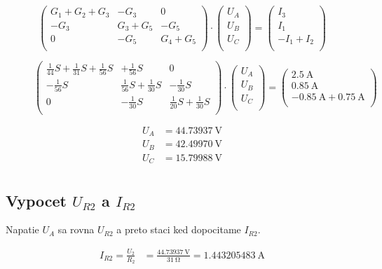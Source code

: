 \begin{figure}[!h]
    \centering
    \begin{equation}
    \begin{pmatrix}
    G_1 + G_2 + G_3  & -G_3 & 0\\
    -G_3  & G_3 + G_5 & -G_5\\
    0  & -G_5 & G_4+G_5 \\
    \end{pmatrix}
    \cdot
    \begin{pmatrix}
    U_A\\
    U_B\\
    U_C\\
    \end{pmatrix}
    =
    \begin{pmatrix}
    I_3\\
    I_1\\
    -I_1+I_2\\
    \end{pmatrix}
    \end{equation}
\end{figure}
\begin{figure}[!h]
    \centering
    \begin{equation}
    \begin{pmatrix}
    \frac{1}{44} S + \frac{1}{31} S +\frac{1}{56} S  & +\frac{1}{56} S & 0\\
    -\frac{1}{56} S  & \frac{1}{56} S + \frac{1}{30} S & -\frac{1}{30} S\\
    0  & -\frac{1}{30} S & \frac{1}{20} S+\frac{1}{30} S \\
    \end{pmatrix}
    \cdot
    \begin{pmatrix}
    U_A\\
    U_B\\
    U_C\\
    \end{pmatrix}
    =
    \begin{pmatrix}
    \SI{2.5}{\ampere}\\
    \SI{0.85}{\ampere}\\
    -\SI{0.85}{\ampere}+\SI{0.75}{\ampere}\\
    \end{pmatrix}
    \end{equation}
\end{figure}

\begin{align*}
    U_A &=  \SI{44.73937}{\volt}\\
    U_B &= \SI{42.49970}{\volt}\\
    U_C &= \SI{15.79988}{\volt}\\
\end{align*}

\subsection{Vypocet $U_{R2}$ a $I_{R2}$}
Napatie $U_A$ sa rovna $U_{R2}$ a preto staci ked dopocitame $I_{R2}$.

\begin{align*}
    I_{R2} = \frac{U_2}{R_2}  &= \frac{\SI{44.73937}{\volt}}{\SI{31}{\ohm}} = \SI{1.443205483}{\ampere}\\
\end{align*}